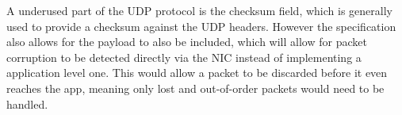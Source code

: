 A underused part of the UDP protocol is the checksum field, which is generally used to provide a checksum against the UDP headers. However the specification also allows for the payload to also be included, which will allow for packet corruption to be detected directly via the NIC instead of implementing a application level one. This would allow a packet to be discarded before it even reaches the app, meaning only lost and out-of-order packets would need to be handled.
